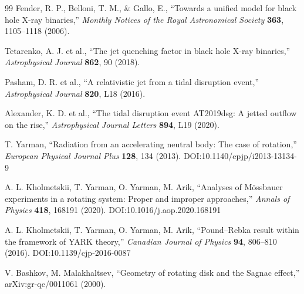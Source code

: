 \documentclass[12pt,a4paper]{article}
\begin{document}
\begin{thebibliography}{99}
		Fender, R. P., Belloni, T. M., \& Gallo, E., ``Towards a unified model for black hole X-ray binaries,'' \emph{Monthly Notices of the Royal Astronomical Society} \textbf{363}, 1105–1118 (2006).
			
		Tetarenko, A. J. et al., ``The jet quenching factor in black hole X-ray binaries,'' \emph{Astrophysical Journal} \textbf{862}, 90 (2018).
			
		Pasham, D. R. et al., ``A relativistic jet from a tidal disruption event,'' \emph{Astrophysical Journal} \textbf{820}, L18 (2016).
			
		Alexander, K. D. et al., ``The tidal disruption event AT2019dsg: A jetted outflow on the rise,'' \emph{Astrophysical Journal Letters} \textbf{894}, L19 (2020).
			
		T. Yarman, ``Radiation from an accelerating neutral body: The case of rotation,'' \emph{European Physical Journal Plus} \textbf{128}, 134 (2013). DOI:10.1140/epjp/i2013-13134-9
			
		A. L. Kholmetskii, T. Yarman, O. Yarman, M. Arik, ``Analyses of Mössbauer experiments in a rotating system: Proper and improper approaches,'' \emph{Annals of Physics} \textbf{418}, 168191 (2020). DOI:10.1016/j.aop.2020.168191
			
		A. L. Kholmetskii, T. Yarman, O. Yarman, M. Arik, ``Pound–Rebka result within the framework of YARK theory,'' \emph{Canadian Journal of Physics} \textbf{94}, 806–810 (2016). DOI:10.1139/cjp-2016-0087
			
		V. Bashkov, M. Malakhaltsev, ``Geometry of rotating disk and the Sagnac effect,'' arXiv:gr-qc/0011061 (2000).
				
		
	\end{thebibliography}
	
\end{document}
